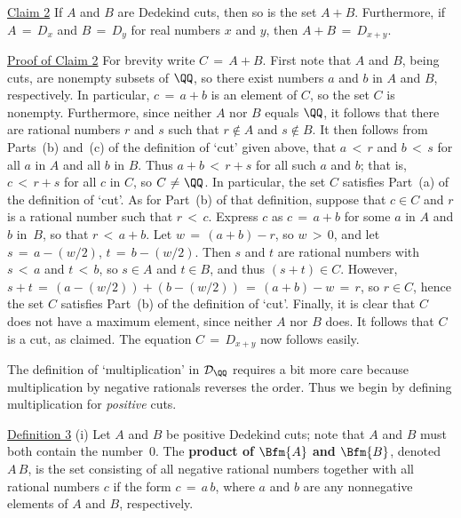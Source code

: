 {{        \underline{Claim 2} If $A$ and $B$ are Dedekind cuts, then so is the set $A+B$.
    Furthermore, if $A \,=\, D_{x}$ and $B \,=\, D_{y}$ for real numbers $x$ and $y$, then $A+B \,=\, D_{x+y}$.

        \underline{Proof of Claim 2} For brevity write $C \,=\, A+B$. First note that $A$ and $B$, being cuts,
    are nonempty subsets of ${\QQ}$, so there exist numbers $a$ and $b$ in $A$ and $B$, respectively.
    In particular, $c \,=\, a+b$ is an element of $C$, so the set $C$ is nonempty.
    Furthermore, since neither $A$ nor $B$ equals ${\QQ}$, it follows that there are rational numbers $r$ and $s$ such that $r \not \in A$ and $s \not \in B$.
    It then follows from Parts~(b) and~(c) of the definition of `cut' given above, that $a\,<\,r$ and $b\,<\,s$ for all $a$ in $A$ and all $b$ in $B$.
    Thus $a+b\,<\,r+s$ for all such $a$ and $b$; that is, $c\,<\,r+s$ for all $c$ in $C$, so $C \,\,{\neq}\,\, {\QQ}$.
    In particular, the set $C$ satisfies Part~(a) of the definition of `cut'. As for Part~(b) of that definition,
    suppose that $c{\in}C$ and $r$ is a rational number such that $r\,<\,c$. Express $c$ as $c \,=\, a+b$ for some $a$ in $A$ and $b$ in~$B$, so that $r\,<\,a+b$.
    Let $w  \,=\, (a+b) - r$, so $w\,>\,0$, and let $s \,=\, a-(w/2)$, $t \,=\, b-(w/2)$.
    Then $s$ and $t$ are rational numbers with $s\,<\,a$ and $t\,<\,b$, so $s{\in}A$ and $t{\in}B$, and thus $(s+t){\in}C$.
    However, $s+t \,=\, (a-(w/2)) + (b-(w/2)) \,=\, (a+b) - w \,=\, r$, so $r{\in}C$, hence the set $C$ satisfies Part~(b) of the definition of `cut'.
    Finally, it is clear that $C$ does not have a maximum element, since neither $A$ nor $B$ does. It follows that $C$ is a cut, as claimed.
    The equation $C \,=\, D_{x+y}$ now follows easily.

\V

        The definition of `multiplication' in ${\cal D}_{{\QQ}}$ requires a bit more care because multiplication by negative rationals reverses the order.
    Thus we begin by defining multiplication for {\em positive} cuts.

        \underline{Definition 3} (i) Let $A$ and $B$ be positive Dedekind cuts; note that $A$ and $B$ must both contain the number~$0$.
    The {\bf product of $\Bfm{A}$ and $\Bfm{B}$}, denoted $A\,B$, is the set consisting of all negative rational numbers
    together with all rational numbers $c$ if the form $c \,=\, a\,b$, where $a$ and $b$ are any nonnegative elements of $A$ and $B$, respectively.
    

}}
